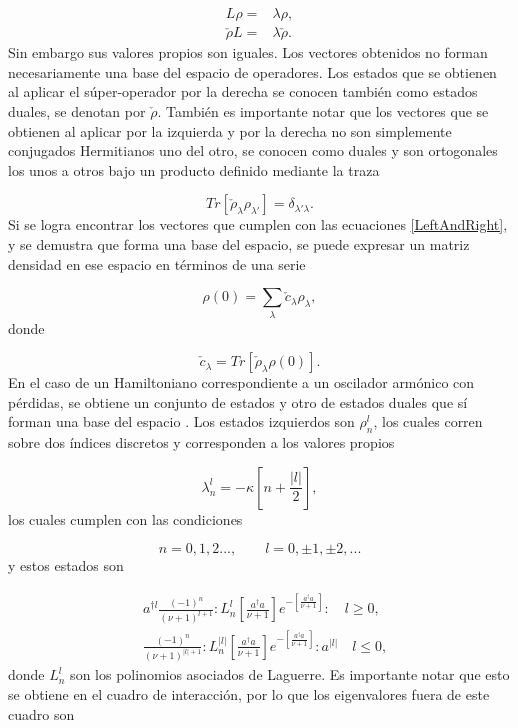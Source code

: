 \documentclass[10pt,a4paper]{report}
\begin{document}
\begin{align}\label{LeftAndRight}
L\rho =& \lambda \rho, \\
\check{\rho} L =& \lambda \check{\rho}.
\end{align} Sin embargo sus valores propios son iguales. Los vectores obtenidos no forman necesariamente una base del espacio de operadores. Los estados que se obtienen al aplicar el súper-operador por la derecha se conocen también como estados duales, se denotan por $\check{\rho}$. También es importante notar que los vectores que se obtienen al aplicar por la izquierda y por la derecha no son simplemente conjugados Hermitianos uno del otro, se conocen como duales y son ortogonales los unos a otros bajo un producto definido mediante la traza\cite{EnglertDB}

\begin{equation}
Tr[\check{\rho}_\lambda \rho_{\lambda'}] = \delta_{\lambda'\lambda}.
\end{equation} Si se logra encontrar los vectores que cumplen con las ecuaciones \eqref{LeftAndRight}, y se demustra que forma una base del espacio, se puede expresar un matriz densidad en ese espacio en términos de una serie

\begin{equation}
\rho(0) = \sum_{\lambda} \check{c}_{\lambda} \rho_{\lambda},
\end{equation} donde

\begin{equation}
\check{c}_\lambda = Tr[\check{\rho}_\lambda \rho(0)].
\end{equation}  En el caso de un Hamiltoniano correspondiente a un oscilador armónico con pérdidas, se obtiene un conjunto de estados y otro de estados duales que sí forman una base del espacio \cite{EnglertDB}. Los estados izquierdos son $\rho_n^l$, los cuales corren sobre dos índices discretos y corresponden a los valores propios
\cite{EnglertDB}

\begin{equation}
\lambda_n^l = -\kappa[n + \frac{|l|}{2}],
\end{equation} los cuales cumplen con las condiciones

\begin{equation}
n=0,1,2...,\qquad l = 0,\pm 1, \pm 2,... 
\end{equation} y estos estados son

\begin{align}\label{DefDB}
&a^{\dagger l}\frac{(-1)^n}{(\nu+1)^{l+1}}:L_n^l[\frac{a^\dagger a}{\nu+1}]e^{-[\frac{a^\dagger a}{\nu+1}]}:\quad l \geq 0, \\
&\frac{(-1)^n}{(\nu+1)^{|l|+1}}:L_n^{|l|}[\frac{a^\dagger a}{\nu+1}]e^{-[\frac{a^\dagger a}{\nu+1}]}:a^{|l|}\quad l \leq 0,
\end{align} donde $L_n^l$ son los polinomios asociados de Laguerre. Es importante notar que esto se obtiene en el cuadro de interacción,
por lo que los eigenvalores fuera de este cuadro son
\end{document}
